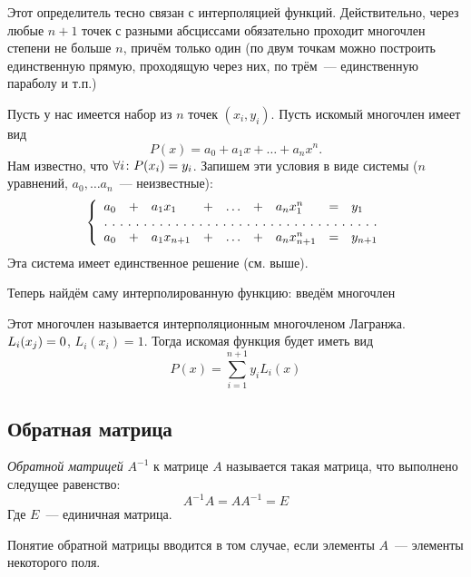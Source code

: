 Этот определитель тесно связан с интерполяцией функций. Действительно, через любые $n+1$ точек с разными абсциссами обязательно проходит многочлен степени не больше $n$, причём только один (по двум точкам можно построить единственную прямую, проходящую через них, по трём~--- единственную параболу и т.п.)

Пусть у нас имеется набор из $n$ точек $(x_i,y_i)$. Пусть искомый многочлен имеет вид $$P(x)=a_0+a_1x+\dots+a_nx^n.$$ Нам известно, что $\forall i\colon P(x_i)=y_i$. Запишем эти условия в виде системы ($n$ уравнений, $a_0,\dots a_n$~--- неизвестные):
$$
\left\{
 \begin{array}{lllllllll}
  a_0&+&a_1x_1&+&\dots&+&a_nx_1^n&=&y_1\\
  \hdotsfor[2]{9}\\
  a_0&+&a_1x_{n+1}&+&\dots&+&a_nx_{n+1}^n&=&y_{n+1}\\
 \end{array}
\right.
$$
Эта система имеет единственное решение (см. выше).

Теперь найдём саму интерполированную функцию: введём многочлен
 
  \begin{center}
  \end{center}
 
 Этот многочлен называется интерполяционным многочленом Лагранжа. $L_i(x_j)\bw=0$, $L_i(x_i)=1$. Тогда искомая функция будет иметь вид
 $$P(x)=\sum_{i=1}^{n+1}y_iL_i(x)$$

\subsection{Обратная матрица}
\label{matrixdet:reverse}

\begin{df}
	\emph{Обратной матрицей} $A^{-1}$ к матрице $A$ называется такая
	матрица, что выполнено следущее равенство:
	$$ A^{-1}A=AA^{-1}=E$$%
	Где $E$~--- единичная матрица.
\end{df}

\begin{note}
	Понятие обратной матрицы вводится в том случае, если элементы
	$A$~--- элементы некоторого поля.
\end{note}

